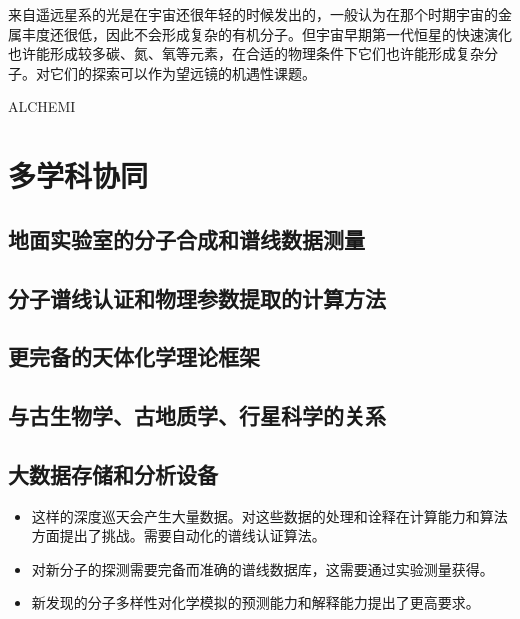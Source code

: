 \documentclass[a4paper]{article}
\begin{document}
来自遥远星系的光是在宇宙还很年轻的时候发出的，一般认为在那个时期宇宙的金属丰度还很低，因此不会形成复杂的有机分子。但宇宙早期第一代恒星的快速演化也许能形成较多碳、氮、氧等元素，在合适的物理条件下它们也许能形成复杂分子。对它们的探索可以作为望远镜的机遇性课题。

ALCHEMI

\section{多学科协同}

\subsection{地面实验室的分子合成和谱线数据测量}

\subsection{分子谱线认证和物理参数提取的计算方法}

\subsection{更完备的天体化学理论框架}

\subsection{与古生物学、古地质学、行星科学的关系}

\subsection{大数据存储和分析设备}

\begin{itemize}
  \item
这样的深度巡天会产生大量数据。对这些数据的处理和诠释在计算能力和算法方面提出了挑战。需要自动化的谱线认证算法。
  \item
对新分子的探测需要完备而准确的谱线数据库，这需要通过实验测量获得。
  \item
新发现的分子多样性对化学模拟的预测能力和解释能力提出了更高要求。
\end{itemize}  




\begingroup
\renewcommand{\section}[2]{}%

\endgroup
\end{document}
